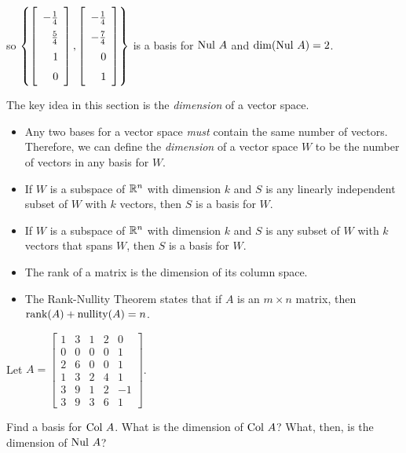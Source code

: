 \begin{example}
so $\left\{\left[ \renewcommand{\arraystretch}{1.5}  \begin{array}{r}-\frac{1}{4}\\\frac{5}{4}\\1\\0\end{array} \right], \left[ \renewcommand{\arraystretch}{1.5}  \begin{array}{r}-\frac{1}{4}\\-\frac{7}{4}\\0\\1 \end{array} \right] \right\}$ is a basis for $\text{Nul } A$ and $\dim(\text{Nul } A) = 2$. 

\end{example}


The key idea in this section is the \emph{dimension} of a vector space.

\begin{itemize}
\item Any two bases for a vector space \emph{must} contain the same number of vectors. Therefore, we can define the \emph{dimension} of a vector space $W$ to be the number of vectors in any basis for $W$.
\item If $W$ is a subspace of $\mathbb{R}^n$ with dimension $k$ and $S$ is any linearly independent subset of $W$ with $k$ vectors, then $S$ is a basis for $W$.
\item If $W$ is a subspace of $\mathbb{R}^n$ with dimension $k$ and $S$ is any subset of $W$ with $k$ vectors that spans $W$, then $S$ is a basis for $W$.
\item The rank of a matrix is the dimension of its column space. 
\item The Rank-Nullity Theorem states that if $A$ is an $m \times n$ matrix, then $\text{rank}(A) + \text{nullity}(A) = n$.
\end{itemize}




\be
\item Let $A =  \left[ \begin{array}{ccccr} 1&3&1&2&0\\ 0&0&0&0&1 \\ 2&6&0&0&1\\ 1&3&2&4&1 \\ 3&9&1&2&-1\\ 3&9&3&6&1 \end{array} \right]$. 
	\ba
	\item Find a basis for $\text{Col } A$. What is the dimension of $\text{Col } A$? What, then, is the dimension of $\text{Nul } A$? 
	

